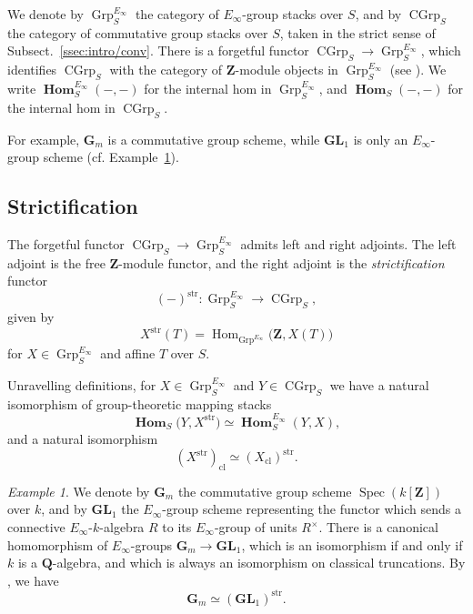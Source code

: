 \documentclass[12pt, oneside]{amsart}
\numberwithin{equation}{section}
\theoremstyle{remark}
\newtheorem{example}[subsubsection]{Example}
\theoremstyle{plain}
\DeclareMathOperator{\Hom}{Hom}
\DeclareMathOperator{\HOM}{\mathbf{Hom}}
\DeclareMathOperator{\spc}{Spec}
\newcommand{\GGm}{\mathbf{G}_{m}}
\newcommand{\GL}{\mathbf{GL}}
\newcommand{\bZ}{\mathbf{Z}}
\newcommand{\bQ}{\mathbf{Q}}
\newcommand{\CGrp}{\operatorname{CGrp}}
\newcommand{\GrpEoo}{\operatorname{Grp}^{E_\infty}}
\begin{document}
We denote by $\GrpEoo_S$ the category of $E_\infty$-group stacks over $S$, and by $\CGrp_S$ the category of commutative group stacks over $S$, taken in the strict sense of Subsect.~\ref{ssec:intro/conv}.
There is a forgetful functor $\CGrp_S \to \GrpEoo_S$, which identifies $\CGrp_S$ with the category of $\bZ$-module objects in $\GrpEoo_S$ (see \cite[Constr.~1.3.9, Ex.~1.2.14]{LurieEll1}).
We write $\HOM_S^{E_\infty}(-,-)$ for the internal hom in $\GrpEoo_S$, and $\HOM_S(-,-)$ for the internal hom in $\CGrp_S$.

For example, $\GGm$ is a commutative group scheme, while $\GL_1$ is only an $E_\infty$-group scheme (cf. Example~\ref{ex:strict units comparison}).

\subsection{Strictification}

The forgetful functor $\CGrp_S\to\GrpEoo_S$ admits left and right adjoints.
The left adjoint is the free $\bZ$-module functor, and the right adjoint is the \emph{strictification} functor
\[
  (-)^{\mathrm{str}}: \GrpEoo_S\to \CGrp_S,
\]
given by
\[
  X^{\mathrm{str}}(T)
  =
  \Hom_{\GrpEoo}
  \bigl(\bZ, X(T)\bigr)
\]
for $X\in\GrpEoo_S$ and affine $T$ over $S$.

Unravelling definitions, for $X\in\GrpEoo_S$ and $Y\in\CGrp_S$ we have a natural isomorphism of group-theoretic mapping stacks
\begin{equation}\label{eq:str adjunction}
  \HOM_S\bigl(Y,X^{\mathrm{str}}\bigr)
  \simeq
  \HOM_S^{E_\infty}(Y,X),
\end{equation}
and a natural isomorphism
\[
  (X^{\mathrm{str}})_{\mathrm{cl}}
  \simeq
  (X_{\mathrm{cl}})^{\mathrm{str}}.
\]

\begin{example}\label{ex:strict units comparison}
  We denote by $\GGm$ the commutative group scheme $\spc(k[\mathbf{Z}])$ over $k$, and by $\GL_1$ the $E_\infty$-group scheme representing the functor which sends a connective $E_\infty$-$k$-algebra $R$ to its $E_\infty$-group of units $R^\times$.
  There is a canonical homomorphism of $E_\infty$-groups $\GGm \to \GL_{1}$, which is an isomorphism if and only if $k$ is a $\bQ$-algebra, and which is always an isomorphism on classical truncations.
  By \cite[Constr.~1.6.10 and Rems.~1.6.11--1.6.12]{LurieEll2}, we have
  \[
    \GGm \simeq (\GL_{1})^{\mathrm{str}}.
  \]
\end{example}
\end{document}
